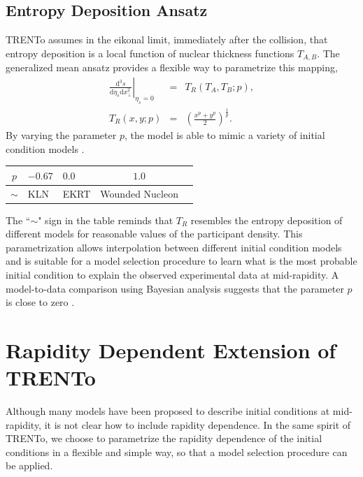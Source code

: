 \documentclass[aps,prl,twocolumn,groupedaddress]{revtex4-1}
\begin{document}
	\subsection{Entropy Deposition Ansatz}
	TRENTo assumes in the eikonal limit, immediately after the collision, that entropy deposition is a local function of nuclear thickness functions $T_{A,B}$. 
	The generalized mean ansatz provides a flexible way to parametrize this mapping,
	\begin{eqnarray}
	\left.\frac{\mathrm{d^3}s}{\mathrm{d}\eta_s \mathrm{d}x_\perp^2}\right\vert_{\eta_s = 0} &=& 	T_R\left(T_A, T_B; p\right),	\\
	T_R(x, y; p) &=& \left(\frac{x^p+y^p}{2}\right)^{\frac{1}{p}}.
	\end{eqnarray}
	By varying the parameter $p$, the model is able to mimic a variety of initial condition models \cite{Scott}.
	\begin{center}
	\begin{tabularx}{0.45\textwidth}{c>{\centering\arraybackslash}m{2.0cm}>{\centering\arraybackslash}m{2cm} cX}
	\toprule[1pt]
	$p$	&	$-0.67$	 	&	$0.0$ 		& 	$1.0$		\\
	\midrule[0.5pt]	
	$\sim$ &		KLN		& 	EKRT		& 		Wounded Nucleon \\
	\bottomrule[1pt]
	\end{tabularx}
	\end{center}
	The ``$\sim$" sign in the table reminds that $T_R$ resembles the entropy deposition of different models for reasonable values of the participant density. 
	This parametrization allows interpolation between different initial condition models and is suitable for a model selection procedure to learn what is the most probable initial condition to explain the observed experimental data at mid-rapidity.
	A model-to-data comparison using Bayesian analysis suggests that the parameter $p$ is close to zero \citep{Jonah}.
\section{Rapidity Dependent Extension of TRENTo}
	Although many models have been proposed to describe initial conditions at mid-rapidity, it is not clear how to include rapidity dependence. In the same spirit of TRENTo, we choose to parametrize the rapidity dependence of the initial conditions in a flexible and simple way, so that a model selection procedure can be applied.
	
\end{document}
